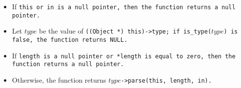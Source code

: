 \begin{itemize}[nosep]

\item If \tt{this} or \tt{in} is a null pointer,
then the function returns a null pointer.

\item Let $type$ be the value of \tt{((Object *) this)->type};
if \tt{is_type(}$type$\tt{)} is \tt{false}, the function returns \tt{NULL}.

\item If \tt{length} is a null pointer or \tt{*length} is
equal to zero, then the function returns a null pointer.

\item Otherwise, the function returns $type$\tt{->parse(this, length, in)}.

\end{itemize}
